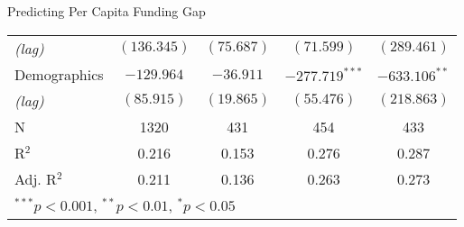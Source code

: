 \documentclass{beamer}
\begin{document}
\begin{frame}{\textmd{Predicting Per Capita Funding Gap}}
\begin{table}
\begin{tiny}
\begin{center}
\begin{tabular}{l c c c c }
\hspace*{0.25cm} \emph{(lag)} & $(136.345)$       & $(75.687)$       & $(71.599)$       & $(289.461)$       \\[0.4ex]
Demographics & $-129.964$        & $-36.911$        & $-277.719^{***}$ & $-633.106^{**}$   \\
\hspace*{0.25cm} \emph{(lag)}& $(85.915)$        & $(19.865)$       & $(55.476)$       & $(218.863)$       \\[0.2ex]
\hline
N           & 1320              & 431               & 454              & 433                \\
R$^2$               & 0.216             & 0.153             & 0.276            & 0.287              \\
Adj. R$^2$          & 0.211             & 0.136             & 0.263            & 0.273              \\
\hline
\multicolumn{5}{l}{$^{***}p<0.001$, $^{**}p<0.01$, $^*p<0.05$}\\
\end{tabular}
\end{center}
\end{tiny}
\end{table}
\end{frame}
\end{document}

